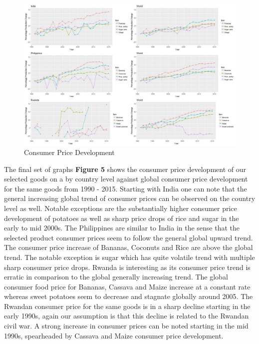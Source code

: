 \documentclass[12pt,a4paper,english]{article}
\begin{document}
\FloatBarrier
\begin{figure}[!htb]
\begin{center}
\includegraphics[scale=0.38]{production.jpg}
\caption{Consumer Price Development}
\label{figure5}
\end{center}
\end{figure}
\FloatBarrier

The final set of graphs \textbf{Figure 5} shows the consumer price development of our selected goods on a by country level against global consumer price development for the same goods from 1990 - 2015. Starting with India one can note that the general increasing global trend of consumer prices can be observed on the country level as well. Notable exceptions are the substantially higher consumer price development of potatoes as well as sharp price drops of rice and sugar in the early to mid 2000s. 
The Philippines are similar to India in the sense that the selected product consumer prices seem to follow the general global upward trend. The consumer price increase of Bananas, Coconuts and Rice are above the global trend. The notable exception is sugar which has quite volatile trend with multiple sharp consumer price drops. 
Rwanda is interesting as its consumer price trend is erratic in comparison to the global generally increasing trend. The global consumer food price for Bananas, Cassava and Maize increase at a constant rate whereas sweet potatoes seem to decrease and stagnate globally around 2005. The Rwandan consumer price for the same goods is in a sharp decline starting in the early 1990s, again our assumption is that this decline is related to the Rwandan civil war. A strong increase in consumer prices can be noted starting in the mid 1990s, spearheaded by Cassava and Maize consumer price development. 
\end{document}
